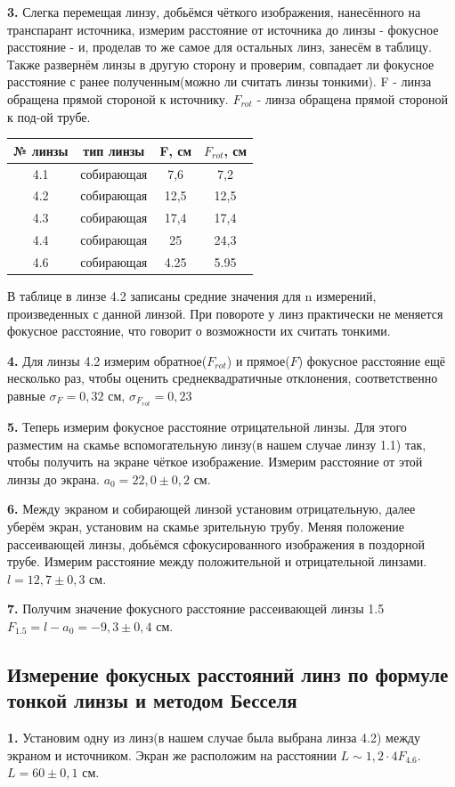 \documentclass[a4paper,12pt]{article}
\begin{document}
\textbf{3.} Слегка перемещая линзу, добьёмся чёткого изображения, нанесённого на транспарант источника, измерим расстояние от источника до линзы - фокусное расстояние - и, проделав то же самое для остальных линз, занесём в таблицу. Также развернём линзы в другую сторону и проверим, совпадает ли фокусное расстояние с ранее полученным(можно ли считать линзы тонкими).
F - линза обращена прямой стороной к источнику.
$F_{rot}$ - линза обращена прямой стороной к под-ой трубе.
\begin{table}[H]
\centering
	\begin{tabular}{|c|c|c|c|} 
	\hline
	№ линзы & тип линзы & F, см & $F_{rot}$, см \\ \hline
	4.1 & собирающая & 7,6 & 7,2 \\ \hline
	4.2 & собирающая & 12,5 & 12,5 \\ \hline
	4.3 & собирающая & 17,4 & 17,4 \\ \hline
	4.4 & собирающая & 25 & 24,3 \\ \hline
	4.6 & собирающая & 4.25 & 5.95 \\ \hline
	\end{tabular}
\end{table}
В таблице в линзе 4.2 записаны средние значения для n измерений, произведенных с данной линзой.
При повороте у линз практически не меняется фокусное расстояние, что говорит о возможности их считать тонкими.

\textbf{4.} Для линзы 4.2 измерим обратное($F_{rot}$) и прямое($F$) фокусное расстояние ещё несколько раз, чтобы оценить среднеквадратичные отклонения, соответственно равные $\sigma_{F} = 0,32$ см, $\sigma_{F_{rot}} = 0,23$

\textbf{5.} Теперь измерим фокусное расстояние отрицательной линзы. Для этого разместим на скамье вспомогательную линзу(в нашем случае линзу 1.1) так, чтобы получить на экране чёткое изображение. Измерим расстояние от этой линзы до экрана. $a_0 = 22,0 \pm 0,2$ см.

\textbf{6.} Между экраном и собирающей линзой установим отрицательную, далее уберём экран, установим на скамье зрительную трубу. Меняя положение рассеивающей линзы, добьёмся сфокусированного изображения в поздорной трубе. Измерим расстояние между положительной и отрицательной линзами. $l = 12,7 \pm 0,3$ см.

\textbf{7.} Получим значение фокусного расстояние рассеивающей линзы 1.5 $F_{1.5} = l - a_0 = -9,3 \pm 0,4$ см.

\subsection*{Измерение фокусных расстояний линз по формуле тонкой линзы и методом Бесселя}
\textbf{1.} Установим одну из линз(в нашем случае была выбрана линза 4.2) между экраном и источником. Экран же расположим на расстоянии $L \sim 1,2 \cdot 4F_{4.6}$. $L = 60 \pm 0,1$ см.
\end{document}
